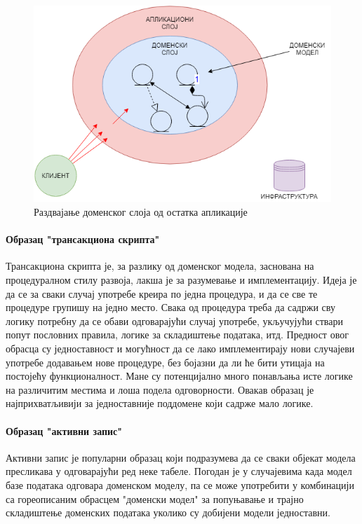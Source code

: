 \documentclass[12pt,oneside]{memoir}
\begin{document}
\begin{figure}[!ht]
  \centering
  \includegraphics[scale=0.6]{slike/razdvajanje-domenskog-sloja.png}
  \caption{Раздвајање доменског слоја од остатка апликације}
  \label{fig:razdvajanjedomenskogsloja}
\end{figure}

\paragraph{Образац "трансакциона скрипта"}
Трансакциона скрипта је, за разлику од доменског модела, заснована на процедуралном стилу развоја, лакша је за разумевање и имплементацију. Идеја је да се за сваки случај употребе креира по једна процедура, и да се све те процедуре групишу на једно место. Свака од процедура треба да садржи сву логику потребну да се обави одговарајући случај употребе, укључујући ствари попут пословних правила, логике за складиштење података, итд. Предност овог обрасца су једноставност и могућност да се лако имплементирају нови случајеви употребе додавањем нове процедуре, без бојазни да ли ће бити утицаја на постојећу функционалност. Мане су потенцијално много понављања исте логике на различитим местима и лоша подела одговорности. Овакав образац је најприхватљивији за једноставније поддомене који садрже мало логике.

\paragraph{Образац "активни запис"}
Активни запис је популарни образац који подразумева да се сваки објекат модела пресликава у одговарајући ред неке табеле. Погодан је у случајевима када модел базе података одговара доменском моделу, па се може употребити у комбинацији са гореописаним обрасцем "доменски модел" за попуњавање и трајно складиштење доменских података уколико су добијени модели једноставни.
\end{document}
